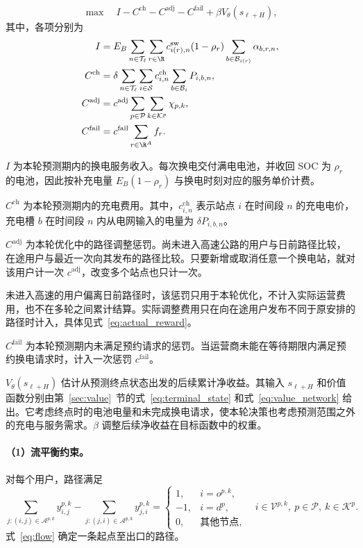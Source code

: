 \begin{equation}
\max\quad I-C^{\mathrm{ch}}-C^{\mathrm{adj}}-C^{\mathrm{fail}}
+\beta V_\theta(s_{\ell+H}),
\label{eq:objective}
\end{equation}
其中，各项分别为
\[
\begin{aligned}
I&=E_B\sum_{n\in\mathcal T_\ell}\sum_{r\in\R}
c_{i(r),n}^{\mathrm{sw}}(1-\rho_r)\sum_{b\in\mathcal B_{i(r)}}\alpha_{b,r,n},\\
C^{\mathrm{ch}}&=\delta\sum_{n\in\mathcal T_\ell}\sum_{i\in\mathcal S}
c_{i,n}^{\mathrm{ch}}\sum_{b\in\mathcal B_i}P_{i,b,n},\\
C^{\mathrm{adj}}&=c^{\mathrm{adj}}\sum_{p\in\mathcal P}\sum_{k\in\mathcal K^p}\chi_{p,k},\\
C^{\mathrm{fail}}&=c^{\mathrm{fail}}\sum_{r\in\R^A}f_r.
\end{aligned}
\]

$I$ 为本轮预测期内的换电服务收入。每次换电交付满电电池，并收回 SOC 为 $\rho_r$ 的电池，因此按补充电量 $E_B(1-\rho_r)$ 与换电时刻对应的服务单价计费。

$C^{\mathrm{ch}}$ 为本轮预测期内的充电费用。其中，$c_{i,n}^{\mathrm{ch}}$ 表示站点 $i$ 在时间段 $n$ 的充电电价，充电槽 $b$ 在时间段 $n$ 内从电网输入的电量为 $\delta P_{i,b,n}$。

$C^{\mathrm{adj}}$ 为本轮优化中的路径调整惩罚。尚未进入高速公路的用户与日前路径比较，在途用户与最近一次向其发布的路径比较。只要新增或取消任意一个换电站，就对该用户计一次 $c^{\mathrm{adj}}$，改变多个站点也只计一次。

未进入高速的用户偏离日前路径时，该惩罚只用于本轮优化，不计入实际运营费用，也不在多轮之间累计结算。实际调整费用只在向在途用户发布不同于原安排的路径时计入，具体见式~\eqref{eq:actual_reward}。

$C^{\mathrm{fail}}$ 为本轮预测期内未满足预约请求的惩罚。当运营商未能在等待期限内满足预约换电请求时，计入一次惩罚 $c^{\mathrm{fail}}$。

$V_\theta(s_{\ell+H})$ 估计从预测终点状态出发的后续累计净收益。其输入 $s_{\ell+H}$ 和价值函数分别由第~\ref{sec:value}~节的式~\eqref{eq:terminal_state} 和式~\eqref{eq:value_network} 给出。它考虑终点时的电池电量和未完成换电请求，使本轮决策也考虑预测范围之外的充电与服务需求。$\beta$ 调整后续净收益在目标函数中的权重。


\paragraph{（1）流平衡约束。}
对每个用户，路径满足
\begin{equation}
\sum_{j:(i,j)\in\mathcal A^{p,k}}y_{i,j}^{p,k}
-\sum_{j:(j,i)\in\mathcal A^{p,k}}y_{j,i}^{p,k}
=\begin{cases}
1,&i=o^{p,k},\\-1,&i=d^p,\\0,&\text{其他节点},
\end{cases}
\quad i\in\mathcal V^{p,k},\ p\in\mathcal P,\ k\in\mathcal K^p.
\label{eq:flow}
\end{equation}
式~\eqref{eq:flow} 确定一条起点至出口的路径。

